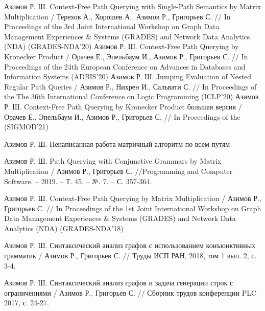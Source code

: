 \begin{thebibliography}{99}
	 Азимов Р. Ш. Context-Free Path Querying with Single-Path Semantics by
	Matrix Multiplication / Терехов А., Хорошев А., Азимов Р., Григорьев С. // In Proceedings of the
	3rd Joint International Workshop on Graph Data Management Experiences \&
	Systems (GRADES) and Network Data Analytics (NDA) (GRADES-NDA’20)
	 Азимов Р. Ш. Context-Free Path Querying by Kronecker
	Product / Орачев Е., Эпельбаум И., Азимов Р., Григорьев С. // In Proceedings of the
	24th European Conference on Advances in Databases and Information Systems (ADBIS’20)
	 Азимов Р. Ш. Jumping Evaluation of Nested Regular Path Queries / Азимов Р., Нихрен И., Сальвати С. // In Proceedings of the
	The 36th International Conference on Logic Programming (ICLP’20)
	 Азимов Р. Ш. Context-Free Path Querying by Kronecker
	Product большая версия / Орачев Е., Эпельбаум И., Азимов Р., Григорьев С. // In Proceedings of the (SIGMOD’21)
	
	 Азимов Р. Ш. Ненаписанная работа матричный алгоритм по всем путям
	
	 Азимов Р. Ш. Path Querying with Conjunctive Grammars by Matrix Multiplication / Азимов Р., Григорьев С. //Programming and Computer Software. – 2019. – Т. 45. – №. 7. – С. 357-364.
	\setcounter{firstbib}{\value{enumiv}}
	
	 Азимов Р. Ш. Context-Free Path Querying by
	Matrix Multiplication / Азимов Р., Григорьев С. // In Proceedings of the
	1st Joint International Workshop on Graph Data Management Experiences \&
	Systems (GRADES) and Network Data Analytics (NDA) (GRADES-NDA’18)
	
	 Азимов Р. Ш. Синтаксический анализ графов с использованием конъюнктивных грамматик / Азимов Р., Григорьев С. // Труды ИСП РАН, 2018, том 1 вып. 2, с. 3-4.
	
	 Азимов Р. Ш. Синтаксический анализ графов и задача генерации строк с ограничениями / Азимов Р., Григорьев С. // Сборник трудов конференции PLC 2017, с. 24-27.
\end{thebibliography}


